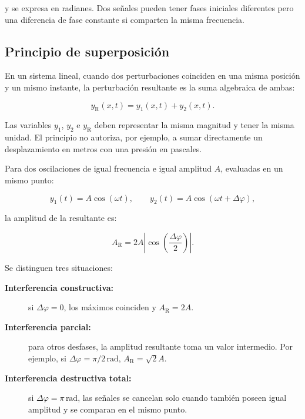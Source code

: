 y se expresa en radianes. Dos señales pueden tener fases iniciales diferentes
pero una diferencia de fase constante si comparten la misma frecuencia.

\subsection{Principio de superposición}
\label{sec:u3-principio-superposicion}

En un sistema lineal, cuando dos perturbaciones coinciden en una misma
posición y un mismo instante, la perturbación resultante es la suma algebraica
de ambas:

\begin{equation}
    y_\mathrm{R}(x,t)=y_1(x,t)+y_2(x,t).
    \label{eq:u3-superposicion}
\end{equation}

Las variables \(y_1\), \(y_2\) e \(y_\mathrm{R}\) deben representar la misma
magnitud y tener la misma unidad. El principio no autoriza, por ejemplo, a
sumar directamente un desplazamiento en metros con una presión en pascales.

Para dos oscilaciones de igual frecuencia e igual amplitud \(A\), evaluadas en
un mismo punto:

\[
    y_1(t)=A\cos(\omega t),
    \qquad
    y_2(t)=A\cos(\omega t+\Delta\varphi),
\]

la amplitud de la resultante es:

\begin{equation}
    A_\mathrm{R}
      =2A\left|\cos\left(\frac{\Delta\varphi}{2}\right)\right|.
    \label{eq:u3-amplitud-resultante}
\end{equation}

Se distinguen tres situaciones:

\begin{description}
    \item[\textbf{Interferencia constructiva:}]
    si \(\Delta\varphi=0\), los máximos coinciden y
    \(A_\mathrm{R}=2A\).
    \item[\textbf{Interferencia parcial:}]
    para otros desfases, la amplitud resultante toma un valor intermedio.
    Por ejemplo, si \(\Delta\varphi=\pi/2\,\text{rad}\),
    \(A_\mathrm{R}=\sqrt{2}A\).
    \item[\textbf{Interferencia destructiva total:}]
    si \(\Delta\varphi=\pi\,\text{rad}\), las señales se cancelan solo cuando
    también poseen igual amplitud y se comparan en el mismo punto.
\end{description}

